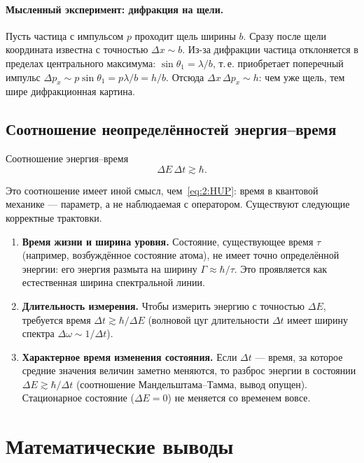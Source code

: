 \paragraph{Мысленный эксперимент: дифракция на щели.} Пусть частица с импульсом $p$ проходит
щель ширины $b$. Сразу после щели координата известна с точностью $\Delta x\sim b$. Из-за дифракции
частица отклоняется в пределах центрального максимума: $\sin\theta_1=\lambda/b$, т.\,е. приобретает
поперечный импульс $\Delta p_x\sim p\sin\theta_1=p\lambda/b=h/b$. Отсюда $\Delta x\,\Delta p_x\sim h$:
чем уже щель, тем шире дифракционная картина.

\subsection{Соотношение неопределённостей энергия--время}

\begin{principle}{Соотношение энергия--время}
\begin{equation}\label{eq:2:Et}
 \Delta E\,\Delta t\gtrsim\hbar .
\end{equation}
\end{principle}

Это соотношение имеет иной смысл, чем~\eqref{eq:2:HUP}: время в квантовой механике — параметр,
а не наблюдаемая с оператором. Существуют следующие корректные трактовки.
\begin{enumerate}
 \item \textbf{Время жизни и ширина уровня.} Состояние, существующее время $\tau$ (например,
       возбуждённое состояние атома), не имеет точно определённой энергии: его энергия размыта
       на ширину $\Gamma\approx\hbar/\tau$. Это проявляется как естественная ширина спектральной
       линии.
 \item \textbf{Длительность измерения.} Чтобы измерить энергию с точностью $\Delta E$, требуется
       время $\Delta t\gtrsim\hbar/\Delta E$ (волновой цуг длительности $\Delta t$ имеет ширину спектра
       $\Delta\omega\sim1/\Delta t$).
 \item \textbf{Характерное время изменения состояния.} Если $\Delta t$ — время, за которое средние
       значения величин заметно меняются, то разброс энергии в состоянии $\Delta E\gtrsim\hbar/\Delta t$
       (соотношение Мандельштама--Тамма, вывод опущен). Стационарное состояние ($\Delta E=0$) не
       меняется со временем вовсе.
\end{enumerate}

\section{Математические выводы}

